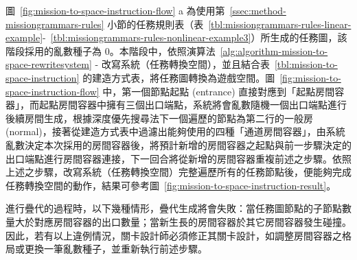 圖~\ref{fig:mission-to-space-instruction-flow} a 為使用第~\ref{ssec:method-missiongrammars-rules} 小節的任務規則表（表~\ref{tbl:missiongrammars-rules-linear-example}-~\ref{tbl:missiongrammars-rules-nonlinear-example3}）所生成的任務圖，該階段採用的亂數種子為 $0$。本階段中，依照演算法~\ref{alg:algorithm-mission-to-space-rewritesystem} - 改寫系統（任務轉換空間），並且結合表~\ref{tbl:mission-to-space-instruction} 的建造方式表，將任務圖轉換為遊戲空間。圖~\ref{fig:mission-to-space-instruction-flow} 中，第一個節點起點 (entrance) 直接對應到「起點房間容器」，而起點房間容器中擁有三個出口端點，系統將會亂數隨機一個出口端點進行後續房間生成，根據深度優先搜尋法下一個遍歷的節點為第二行的一般房 (normal)，接著從建造方式表中過濾出能夠使用的四種「通道房間容器」，由系統亂數決定本次採用的房間容器後，將預計新增的房間容器之起點與前一步驟決定的出口端點進行房間容器連接，下一回合將從新增的房間容器重複前述之步驟。依照上述之步驟，改寫系統（任務轉換空間）完整遍歷所有的任務節點後，便能夠完成任務轉換空間的動作，結果可參考圖~\ref{fig:mission-to-space-instruction-result}。

進行疊代的過程時，以下幾種情形，疊代生成將會失敗：當任務圖節點的子節點數量大於對應房間容器的出口數量；當新生長的房間容器於其它房間容器發生碰撞。因此，若有以上違例情況，關卡設計師必須修正其關卡設計，如調整房間容器之格局或更換一筆亂數種子，並重新執行前述步驟。

